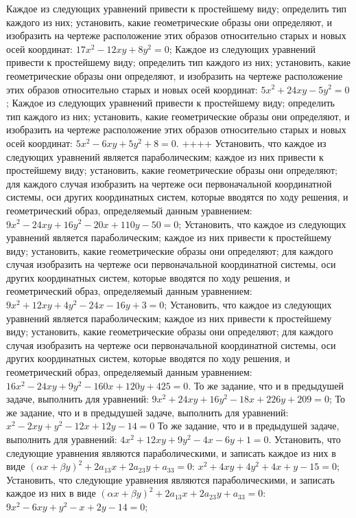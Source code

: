 Каждое из следующих уравнений привести к простейшему виду; определить тип каждого из них; установить, какие геометрические образы они определяют, и изобразить на чертеже расположение этих образов относительно старых и новых осей координат: $17 x^2-12 x y+8 y^2=0$;
Каждое из следующих уравнений привести к простейшему виду; определить тип каждого из них; установить, какие геометрические образы они определяют, и изобразить на чертеже расположение этих образов относительно старых и новых осей координат: $5 x^2+24 x y-5 y^2=0$;
Каждое из следующих уравнений привести к простейшему виду; определить тип каждого из них; установить, какие геометрические образы они определяют, и изобразить на чертеже расположение этих образов относительно старых и новых осей координат: $5 x^2-6 x y+5 y^2+8=0$.
++++
Установить, что каждое из следующих уравнений является параболическим; каждое из них привести к простейшему виду; установить, какие геометрические образы они определяют; для каждого случая изобразить на чертеже оси первоначальной координатной системы, оси других координатных систем, которые вводятся по ходу решения, и геометрический образ, определяемый данным уравнением: $9 x^2-24 x y+16 y^2-20 x+110 y-50=0$;
Установить, что каждое из следующих уравнений является параболическим; каждое из них привести к простейшему виду; установить, какие геометрические образы они определяют; для каждого случая изобразить на чертеже оси первоначальной координатной системы, оси других координатных систем, которые вводятся по ходу решения, и геометрический образ, определяемый данным уравнением: $9 x^2+12 x y+4 y^2-24 x-16 y+3=0$;
Установить, что каждое из следующих уравнений является параболическим; каждое из них привести к простейшему виду; установить, какие геометрические образы они определяют; для каждого случая изобразить на чертеже оси первоначальной координатной системы, оси других координатных систем, которые вводятся по ходу решения, и геометрический образ, определяемый данным уравнением: $16 x^2-24 x y+9 y^2-160 x+120 y+425=0$.
То же задание, что и в предыдушей задаче, выполнить для уравнений: $9 x^2+24 x y+16 y^2-18 x+226 y+209=0$;
То же задание, что и в предыдушей задаче, выполнить для уравнений: $x^2-2 x y+y^2-12 x+12 y-14=0$
То же задание, что и в предыдушей задаче, выполнить для уравнений: $4 x^2+12 x y+9 y^2-4 x-6 y+1=0$.
Установить, что следующие уравнения являются параболическими, и записать каждое из них в виде $(\alpha x+\beta y)^2+2 a_{13} x+2 a_{23} y+a_{33}=0$: $x^2+4 x y+4 y^2+4 x+y-15=0 ;$
Установить, что следующие уравнения являются параболическими, и записать каждое из них в виде $(\alpha x+\beta y)^2+2 a_{13} x+2 a_{23} y+a_{33}=0$: $9 x^2-6 x y+y^2-x+2 y-14=0$;
